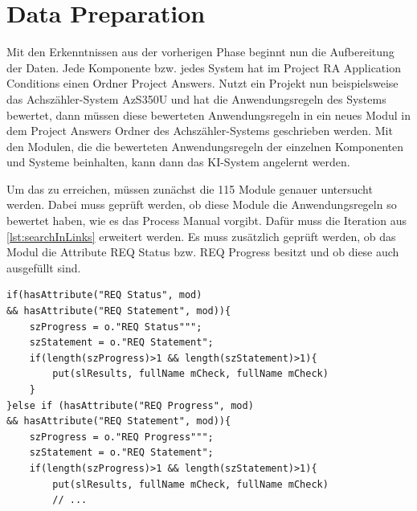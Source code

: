 \section{Data Preparation}

Mit den Erkenntnissen aus der vorherigen Phase beginnt nun die Aufbereitung der Daten. Jede Komponente bzw. jedes System hat im Project RA Application Conditions einen Ordner  Project
Answers\grqq{}. Nutzt ein Projekt nun beispielsweise das Achszähler-System AzS350U und hat die Anwendungsregeln des Systems bewertet, dann müssen diese bewerteten Anwendungsregeln in ein neues Modul 
in dem  Project Answers\grqq{} Ordner des Achszähler-Systems geschrieben werden. Mit den Modulen, die die bewerteten Anwendungsregeln der einzelnen Komponenten und Systeme beinhalten,
kann dann das KI-System angelernt werden. 

Um das zu erreichen, müssen zunächst die 115 Module genauer untersucht werden. Dabei muss geprüft werden, ob diese Module die Anwendungsregeln so bewertet haben, wie es das Process Manual vorgibt.
Dafür muss die Iteration aus \ref*{lst:searchInLinks} erweitert werden. Es muss zusätzlich geprüft werden, ob das Modul die Attribute REQ Status bzw. REQ Progress besitzt und ob diese auch 
ausgefüllt sind. 

\begin{lstlisting}[caption={Suche nach bewerteten Anwendungsregeln},captionpos=b, label = lst:searchARSolutions]                                                       
if(hasAttribute("REQ Status", mod) 
&& hasAttribute("REQ Statement", mod)){  
    szProgress = o."REQ Status""";
    szStatement = o."REQ Statement";
    if(length(szProgress)>1 && length(szStatement)>1){ 
        put(slResults, fullName mCheck, fullName mCheck)
    }
}else if (hasAttribute("REQ Progress", mod) 
&& hasAttribute("REQ Statement", mod)){
    szProgress = o."REQ Progress""";
    szStatement = o."REQ Statement";
    if(length(szProgress)>1 && length(szStatement)>1){ 
        put(slResults, fullName mCheck, fullName mCheck)
        // ...
\end{lstlisting}

